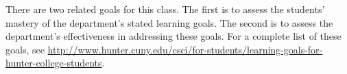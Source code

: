There are two related goals for this class. The first is to assess the students’ mastery of the department’s stated learning goals. The second is to assess the department’s effectiveness in addressing these goals. For a complete list of these goals, see \url{http://www.hunter.cuny.edu/csci/for-students/learning-goals-for-hunter-college-students}.